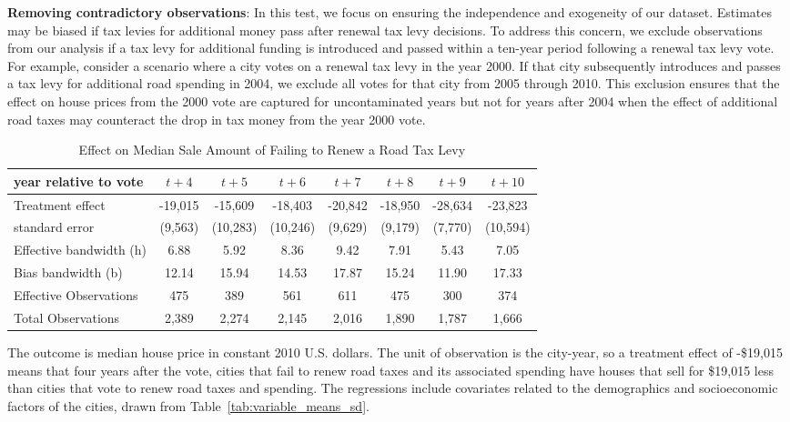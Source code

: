 \vskip 0.5cm

\textbf{Removing contradictory observations}: In this test, we focus on ensuring the independence and exogeneity of our dataset. Estimates may be biased if tax levies for additional money pass after renewal tax levy decisions.
To address this concern, we exclude observations from our analysis if a tax levy for additional funding is introduced and passed within a ten-year period following a renewal tax levy vote. 
For example, consider a scenario where a city votes on a renewal tax levy in the year 2000. If that city subsequently introduces and passes a tax levy for additional road spending in 2004, we exclude all votes for that city from 2005 through 2010. This exclusion ensures that the effect on house prices from the 2000 vote are captured for uncontaminated years but not for years after 2004 when the effect of additional road taxes may counteract the drop in tax money from the year 2000 vote.

\begin{table}[ht]
    \centering
    \caption{Effect on Median Sale Amount of Failing to Renew a Road Tax Levy}
    \label{tab:uncontaminated}
    \begin{tabular}{p{2.8cm}ccccccc}
        \hline
        year relative to vote & $t + 4$ & $t + 5$ & $t + 6$ & $t + 7$ & $t + 8$ & $t + 9$ & $t + 10$ \\
        \hline
        Treatment effect & -19,015 & -15,609 & -18,403 & -20,842 & -18,950 & -28,634 & -23,823 \\
        standard error   & (9,563) & (10,283) & (10,246) & (9,629) & (9,179) & (7,770)  & (10,594) \\
        Effective bandwidth (h) & 6.88 & 5.92 & 8.36 & 9.42 & 7.91 & 5.43 & 7.05 \\
        Bias bandwidth (b)      & 12.14 & 15.94 & 14.53 & 17.87 & 15.24 & 11.90 & 17.33 \\
        Effective Observations  & 475 & 389 & 561 & 611 & 475 & 300 & 374 \\
        Total Observations      & 2,389 & 2,274 & 2,145 & 2,016 & 1,890 & 1,787 & 1,666 \\
        \hline
    \end{tabular}
    \begin{tablenotes}
        \small
        \item The outcome is median house price in constant 2010 U.S. dollars. The unit of observation is the city-year, so a treatment effect of -\$19,015 means that four years after the vote, cities that fail to renew road taxes and its associated spending have houses that sell for \$19,015 less than cities that vote to renew road taxes and spending. The regressions include covariates related to the demographics and socioeconomic factors of the cities, drawn from Table~\ref{tab:variable_means_sd}.
    \end{tablenotes}
\end{table}


